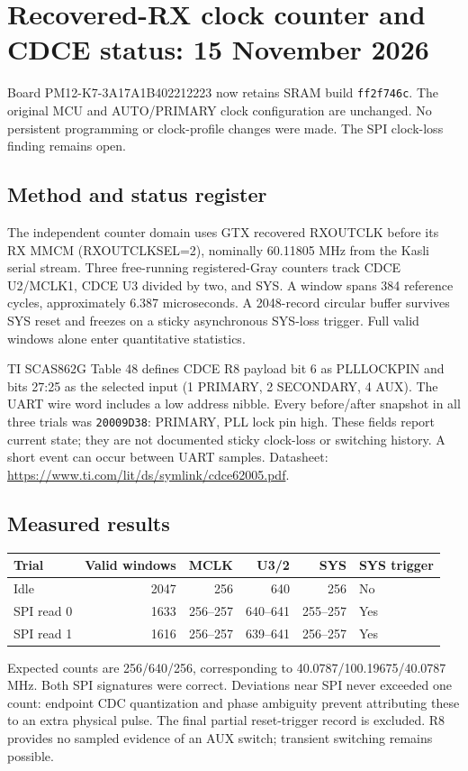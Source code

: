 \clearpage
\section{Recovered-RX clock counter and CDCE status: 15 November 2026}
Board PM12-K7-3A17A1B402212223 now retains SRAM build \texttt{ff2f746c}.
The original MCU and AUTO/PRIMARY clock configuration are unchanged. No persistent
programming or clock-profile changes were made. The SPI clock-loss finding remains open.

\subsection{Method and status register}
The independent counter domain uses GTX recovered RXOUTCLK before its RX MMCM
(RXOUTCLKSEL=2), nominally 60.11805 MHz from the Kasli serial stream.
Three free-running registered-Gray counters track CDCE U2/MCLK1, CDCE U3 divided
by two, and SYS. A window spans 384 reference cycles, approximately 6.387 microseconds.
A 2048-record circular buffer survives SYS reset and freezes on a sticky asynchronous
SYS-loss trigger. Full valid windows alone enter quantitative statistics.

TI SCAS862G Table 48 defines CDCE R8 payload bit 6 as PLLLOCKPIN and bits 27:25
as the selected input (1 PRIMARY, 2 SECONDARY, 4 AUX). The UART wire word includes
a low address nibble. Every before/after snapshot in all three trials was
\texttt{20009D38}: PRIMARY, PLL lock pin high. These fields report current state;
they are not documented sticky clock-loss or switching history. A short event can
occur between UART samples. Datasheet: \url{https://www.ti.com/lit/ds/symlink/cdce62005.pdf}.

\subsection{Measured results}
\begin{center}\begin{tabular}{lrrrrl}\toprule
Trial & Valid windows & MCLK & U3/2 & SYS & SYS trigger\\\midrule
Idle & 2047 & 256 & 640 & 256 & No\\
SPI read 0 & 1633 & 256--257 & 640--641 & 255--257 & Yes\\
SPI read 1 & 1616 & 256--257 & 639--641 & 256--257 & Yes\\\bottomrule
\end{tabular}\end{center}
Expected counts are 256/640/256, corresponding to 40.0787/100.19675/40.0787 MHz.
Both SPI signatures were correct. Deviations near SPI never exceeded one count:
endpoint CDC quantization and phase ambiguity prevent attributing these to an
extra physical pulse. The final partial reset-trigger record is excluded.
R8 provides no sampled evidence of an AUX switch; transient switching remains possible.

